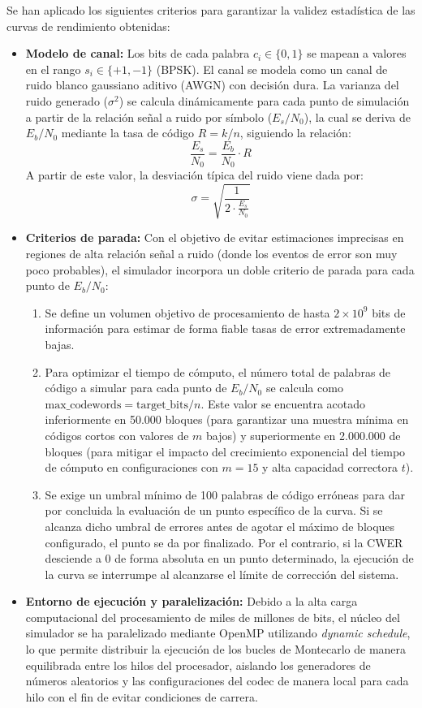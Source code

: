 Se han aplicado los siguientes criterios para garantizar la validez estadística de las curvas de rendimiento obtenidas:
\begin{itemize}
    \item \textbf{Modelo de canal:} Los bits de cada palabra $c_i \in \{0, 1\}$ se mapean a valores en el rango $s_i \in \{+1, -1\}$ (BPSK). El canal se modela como un canal de ruido blanco gaussiano aditivo (AWGN) con decisión dura. La varianza del ruido generado ($\sigma^2$) se calcula dinámicamente para cada punto de simulación a partir de la relación señal a ruido por símbolo ($E_s/N_0$), la cual se deriva de $E_b/N_0$ mediante la tasa de código $R = k/n$, siguiendo la relación:
    $$\frac{E_s}{N_0} = \frac{E_b}{N_0} \cdot R$$
    A partir de este valor, la desviación típica del ruido viene dada por:
    $$\sigma = \sqrt{\frac{1}{2 \cdot \frac{E_s}{N_0}}}$$
    
    \item \textbf{Criterios de parada:} Con el objetivo de evitar estimaciones imprecisas en regiones de alta relación señal a ruido (donde los eventos de error son muy poco probables), el simulador incorpora un doble criterio de parada para cada punto de $E_b/N_0$:
    \begin{enumerate}
        \item Se define un volumen objetivo de procesamiento de hasta $2 \times 10^9$ bits de información para estimar de forma fiable tasas de error extremadamente bajas.
        \item Para optimizar el tiempo de cómputo, el número total de palabras de código a simular para cada punto de $E_b/N_0$ se calcula como $\text{max\_codewords} = \text{target\_bits} / n$. Este valor se encuentra acotado inferiormente en 50.000 bloques (para garantizar una muestra mínima en códigos cortos con valores de $m$ bajos) y superiormente en 2.000.000 de bloques (para mitigar el impacto del crecimiento exponencial del tiempo de cómputo en configuraciones con $m=15$ y alta capacidad correctora $t$).
        \item Se exige un umbral mínimo de 100 palabras de código erróneas para dar por concluida la evaluación de un punto específico de la curva. Si se alcanza dicho umbral de errores antes de agotar el máximo de bloques configurado, el punto se da por finalizado. Por el contrario, si la CWER desciende a 0 de forma absoluta en un punto determinado, la ejecución de la curva se interrumpe al alcanzarse el límite de corrección del sistema.
    \end{enumerate}

    \item \textbf{Entorno de ejecución y paralelización:} Debido a la alta carga computacional del procesamiento de miles de millones de bits, el núcleo del simulador se ha paralelizado mediante OpenMP utilizando \textit{dynamic schedule}, lo que permite distribuir la ejecución de los bucles de Montecarlo de manera equilibrada entre los hilos del procesador, aislando los generadores de números aleatorios y las configuraciones del codec de manera local para cada hilo con el fin de evitar condiciones de carrera.
\end{itemize}

